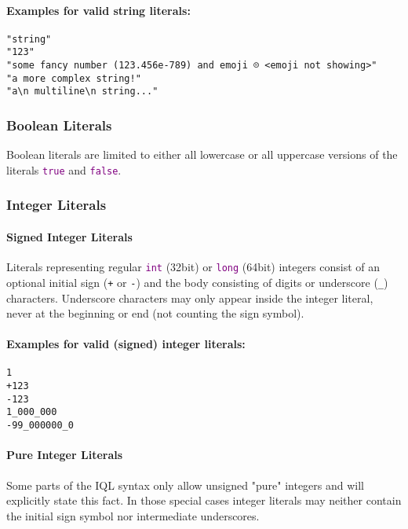 \documentclass[11pt,a4paper,portrait]{article}
\newcommand{\iql}{IQL\xspace}
\newcommand{\keyword}[1]{\textcolor{purple}{\texttt{#1}}}
\begin{document}
\paragraph{Examples for valid string literals:}

\begin{verbatim}
"string"
"123"
"some fancy number (123.456e-789) and emoji ☹ <emoji not showing>"
"a more complex string!"
"a\n multiline\n string..."
\end{verbatim}

\subsubsection{Boolean Literals}
\label{sec:boolean-literals}

Boolean literals are limited to either all lowercase or all uppercase versions of the literals \keyword{true} and \keyword{false}.

\subsubsection{Integer Literals}
\label{sec:integer-literals}

\paragraph{Signed Integer Literals}
Literals representing regular \keyword{int} (32bit) or \keyword{long} (64bit) integers consist of an optional initial sign (\texttt{+} or \texttt{-}) and the body consisting of digits or underscore (\texttt{\_}) characters.
Underscore characters may only appear inside the integer literal, never at the beginning or end (not counting the sign symbol).

\paragraph{Examples for valid (signed) integer literals:}

\begin{verbatim}
1
+123
-123
1_000_000
-99_000000_0
\end{verbatim}

\paragraph{Pure Integer Literals}
Some parts of the \iql syntax only allow unsigned "pure" integers and will explicitly state this fact. In those special cases integer literals may neither contain the initial sign symbol nor intermediate underscores.
\end{document}
